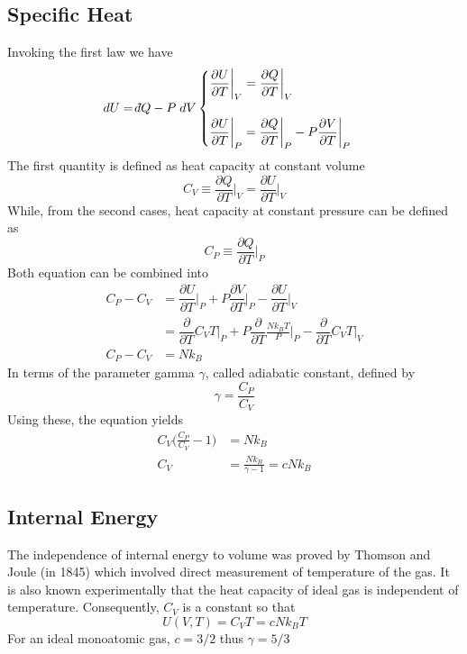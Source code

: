 \documentclass[../../../Main.tex]{subfiles}
\begin{document}
\subsection{Specific Heat}
Invoking the first law we have
\begin{align*}
    dU=\dbar Q-P\;dV\begin{cases}
        \dfrac{\partial U}{\partial T}\bigg|_V=\dfrac{\partial Q}{\partial T}\bigg|_V\\
        \\
        \dfrac{\partial U}{\partial T}\bigg|_P=\dfrac{\partial Q}{\partial T}\bigg|_P-P\dfrac{\partial V}{\partial T}\bigg|_P
    \end{cases}
\end{align*}
The first quantity is defined as heat capacity at constant volume
\begin{equation*}
    C_V\equiv\frac{\partial Q}{\partial T}\bigg|_V=\frac{\partial U}{\partial T}\bigg|_V
\end{equation*}
While, from the second cases, heat capacity at constant pressure can be defined as 
\begin{equation*}
    C_P\equiv\dfrac{\partial Q}{\partial T}\bigg|_P
\end{equation*}
Both equation can be combined into 
\begin{align*}
    C_P-C_V&=\dfrac{\partial U}{\partial T}\bigg|_P+P\dfrac{\partial V}{\partial T}\bigg|_P-\dfrac{\partial U}{\partial T}\bigg|_V\\
    &=\dfrac{\partial }{\partial T}C_VT\bigg|_P+P\dfrac{\partial }{\partial T}\frac{Nk_BT}{P}\bigg|_P-\dfrac{\partial }{\partial T}C_VT\bigg|_V\\
    C_P-C_V&=Nk_B
\end{align*}
In terms of the parameter gamma $\gamma$, called adiabatic constant, defined by
\begin{equation*}
    \gamma=\frac{C_P}{C_V}
\end{equation*}
Using these, the equation yields 
\begin{align*}
    C_V\biggl(\frac{C_P}{C_V}-1\biggr)&=Nk_B\\
    C_V&=\frac{Nk_B}{\gamma-1}=cNk_B
\end{align*}

\subsection{Internal Energy}
The independence of internal energy to volume was proved by Thomson and Joule (in 1845) which involved direct measurement of temperature of the gas. It is also known experimentally that the heat capacity of ideal gas is independent of temperature. Consequently, $C_V$ is a constant so that
\begin{equation*}
    U(V,T)=C_VT=cNk_BT
\end{equation*}
For an ideal monoatomic gas, $c=3/2$ thus $\gamma=5/3$
\end{document}
